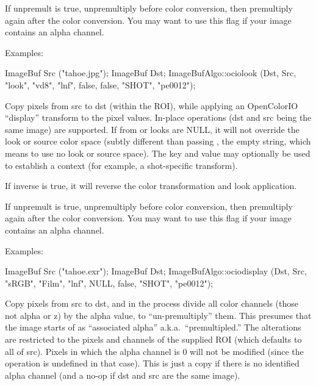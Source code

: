 If {\cf unpremult} is {\cf true}, unpremultiply before color conversion,
then premultiply again after the color conversion.  You may want to use
this flag if your image contains an alpha channel.

\smallskip
\noindent Examples:
\begin{code}
    ImageBuf Src ("tahoe.jpg");
    ImageBuf Dst;
    ImageBufAlgo::ociolook (Dst, Src, "look", "vd8", "lnf", false, false,
                            "SHOT", "pe0012");
\end{code}
\apiend


 
Copy pixels from {\cf src} to {\cf dst} (within the ROI), while
applying an OpenColorIO ``display'' transform to the pixel values.
In-place operations ({\cf dst} and {\cf src} being the same image)
are supported.  If {\cf from} or {\cf looks} are {\cf NULL}, it will not
override the look or source color space (subtly different than
passing \qkw{}, the empty string, which means to use no look or source
space).  The {\cf key} and {\cf value} may optionally be used
to establish a context (for example, a shot-specific transform).

If {\cf inverse} is {\cf true}, it will reverse the color transformation
and look application.

If {\cf unpremult} is {\cf true}, unpremultiply before color conversion,
then premultiply again after the color conversion.  You may want to use
this flag if your image contains an alpha channel.

\smallskip
\noindent Examples:
\begin{code}
    ImageBuf Src ("tahoe.exr");
    ImageBuf Dst;
    ImageBufAlgo::ociodisplay (Dst, Src, "sRGB", "Film", "lnf", NULL,
                               false, "SHOT", "pe0012");
\end{code}
\apiend


 
Copy pixels from {\cf src} to {\cf dst}, and in the process 
divide all color channels (those not alpha or z) 
by the alpha value, to ``un-premultiply'' them.  This presumes that the
image starts of as ``associated alpha'' a.k.a.\ ``premultipled.''  The
alterations are restricted to the pixels and channels of the supplied
ROI (which defaults to all of {\cf src}).  Pixels in which the alpha
channel is 0 will not be modified (since the operation is undefined in
that case).  This is just a copy if there is no identified alpha channel
(and a no-op if {\cf dst} and {\cf src} are the same image).


